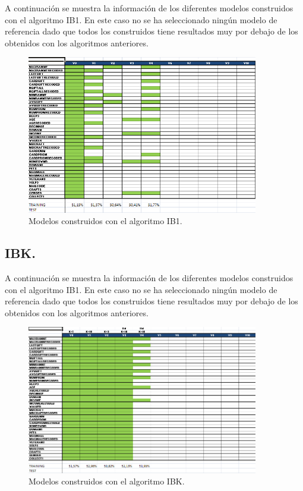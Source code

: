 A continuación se muestra la información de los diferentes modelos construidos con el algoritmo IB1. En este caso no se ha seleccionado ningún modelo de referencia dado que todos los construidos tiene resultados muy por debajo de los obtenidos con los algoritmos anteriores.

\begin{figure}[H]
\begin{center}
\includegraphics[width=0.9\textwidth]{img/ib1-1}
\caption{Modelos construidos con el algoritmo IB1.}
\end{center}
\end{figure}

\subsection{IBK.}

A continuación se muestra la información de los diferentes modelos construidos con el algoritmo IB1. En este caso no se ha seleccionado ningún modelo de referencia dado que todos los construidos tiene resultados muy por debajo de los obtenidos con los algoritmos anteriores.

\begin{figure}[H]
\begin{center}
\includegraphics[width=0.9\textwidth]{img/ibk-2}
\caption{Modelos construidos con el algoritmo IBK.}
\end{center}
\end{figure}


